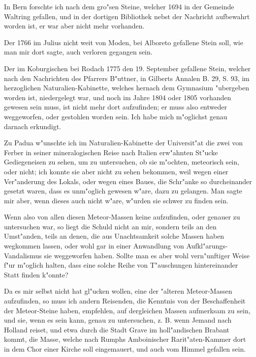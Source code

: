 \documentclass[a4paper, 11pt, oneside, polutonikogreek, german]{article}
\begin{document}
In Bern forschte ich nach dem gro"sen Steine, welcher 1694 in der Gemeinde Waltring gefallen, und in der dortigen Bibliothek nebst der Nachricht aufbewahrt worden ist, er war aber nicht mehr vorhanden.

Der 1766 im Julius nicht weit von Moden, bei Alboreto gefallene Stein soll, wie man mir dort sagte, auch verloren gegangen sein.

Der im Koburgischen bei Rodach 1775 den 19. September gefallene Stein, welcher nach den Nachrichten des Pfarrers B"uttner, in Gilberts Annalen B. 29, S. 93, im herzoglichen Naturalien-Kabinette, welches hernach dem Gymnasium "ubergeben worden ist, niedergelegt war, und noch im Jahre 1804 oder 1805 vorhanden gewesen sein muss, ist nicht mehr dort aufzufinden; er muss also entweder weggeworfen, oder gestohlen worden sein. Ich habe mich m"oglichst genau darnach erkundigt.

Zu Padua w"unschte ich im Naturalien-Kabinette der Universit"at die zwei von Ferber in seiner mineralogischen Reise nach Italien erw"ahnten St"ucke Gediegeneisen zu sehen, um zu untersuchen, ob sie m"ochten, meteorisch sein, oder nicht; ich konnte sie aber nicht zu sehen bekommen, weil wegen einer Ver"anderung des Lokals, oder wegen eines Baues, die Schr"anke so durcheinander gesetzt waren, dass es unm"oglich gewesen w"are, dazu zu gelangen. Man sagte mir aber, wenn dieses auch nicht w"are, w"urden sie schwer zu finden sein.

Wenn also von allen diesen Meteor-Massen keine aufzufinden, oder genauer zu untersuchen war, so liegt die Schuld nicht an mir, sondern teils an den Umst"anden, teils an denen, die aus Unachtsamkeit solche Massen haben wegkommen lassen, oder wohl gar in einer Anwandlung von Aufkl"arungs-Vandalismus sie weggeworfen haben. Sollte man es aber wohl vern"unftiger Weise f"ur m"oglich halten, dass eine solche Reihe von T"auschungen hintereinander Statt finden k"onnte?

Da es mir selbst nicht hat gl"ucken wollen, eine der "alteren Meteor-Massen aufzufinden, so muss ich andern Reisenden, die Kenntnis von der Beschaffenheit der Meteor-Steine haben, empfehlen, auf dergleichen Massen aufmerksam zu sein, und sie, wenn es sein kann, genau zu untersuchen, z. B. wenn Jemand nach Holland reiset, und etwa durch die Stadt Grave im holl"andischen Brabant kommt, die Masse, welche nach Rumphs Amboinischer Rarit"aten-Kammer dort in dem Chor einer Kirche soll eingemauert, und auch vom Himmel gefallen sein.
\end{document}
